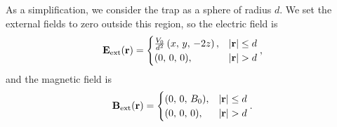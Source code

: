As a simplification, we consider the trap as a sphere of radius $d$. We set the external fields to zero outside this region, so the electric field is   
\begin{equation}\label{eq:trap_ext_E_field}
    \mathbf{E}_\mathrm{ext} (\mathbf{r}) = 
    \begin{cases}
        \frac{V_0}{d^2} \left( x,\, y,\, -2z \right), & \abs{\mathbf{r}} \leq d \\
        (0,\,0,\,0),  & \abs{\mathbf{r}} > d
    \end{cases}, 
\end{equation}
and the magnetic field is 
\begin{equation}\label{eq:trap_ext_B_field}
    \mathbf{B}_\mathrm{ext} (\mathbf{r}) = 
    \begin{cases}
        (0,\,0,\,B_0), & \abs{\mathbf{r}} \leq d \\
        (0,\,0,\,0), & \abs{\mathbf{r}} > d
    \end{cases}.
\end{equation}


